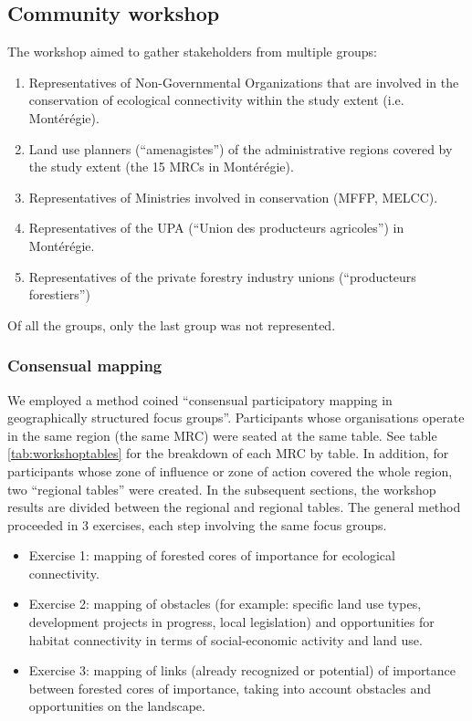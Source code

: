 \subsection{Community workshop}

The workshop aimed to gather stakeholders from multiple groups:
\begin{enumerate}
  \item Representatives of Non-Governmental Organizations that are involved in the conservation of ecological connectivity within the study extent (i.e. Montérégie).
  \item Land use planners (“amenagistes”) of the administrative regions covered by the study extent (the 15 MRCs in Montérégie).
  \item Representatives of Ministries involved in conservation (MFFP, MELCC).
  \item Representatives of the UPA (“Union des producteurs agricoles”) in Montérégie.
  \item Representatives of the private forestry industry unions (“producteurs forestiers”)
\end{enumerate}
Of all the groups, only the last group was not represented. \\

\subsubsection{Consensual mapping}

We employed a method coined “consensual participatory mapping in geographically structured focus groups”. Participants whose organisations operate in the same region (the same MRC) were seated at the same table. See table \ref{tab:workshoptables} for the breakdown of each MRC by table. In addition, for participants whose zone of influence or zone of action covered the whole region, two “regional tables” were created. In the subsequent sections, the workshop results are divided between the regional and regional tables.
The general method proceeded in 3 exercises, each step involving the same focus groups.

\begin{itemize}
  \item Exercise 1: mapping of forested cores of importance for ecological connectivity.
  \item Exercise 2: mapping of obstacles (for example: specific land use types, development projects in progress, local legislation) and opportunities for habitat connectivity in terms of social-economic activity and land use.
  \item Exercise 3: mapping of links (already recognized or potential) of importance between forested cores of importance, taking into account obstacles and opportunities on the landscape.
\end{itemize}

